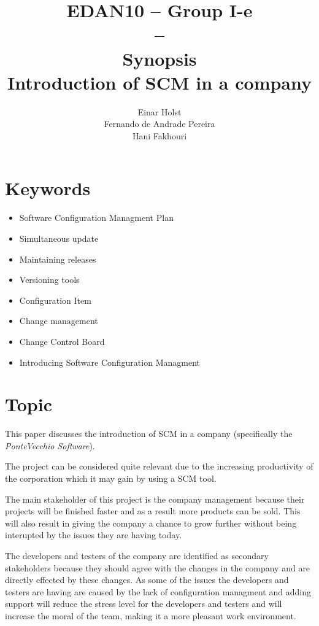 \documentclass[a4paper]{article}
\title{EDAN10 -- Group I-e\\--\\ Synopsis \\
Introduction of SCM in a company 
}
\author{Einar Holst \\
Fernando de Andrade Pereira \\
Hani Fakhouri
}
\begin{document}
\maketitle
\thispagestyle{empty}
\clearpage

\tableofcontents
\thispagestyle{empty}
\clearpage

\setcounter{page}{1}

\section{Keywords}
\begin{itemize}
\item Software Configuration Managment Plan
\item Simultaneous update
\item Maintaining releases
\item Versioning tools
\item Configuration Item
\item Change management
\item Change Control Board
\item Introducing Software Configuration Managment
\end{itemize}


\section{Topic}
This paper discusses the introduction of SCM in a company (specifically the \emph{PonteVecchio Software}).

The project can be considered quite relevant due to the increasing productivity of the corporation which it may gain by using a SCM tool.

The main stakeholder of this project is the company management because their projects will be finished faster and as a result more products can be sold. This will also result in giving the company a chance to grow further without being interupted by the issues they are having today.

The developers and testers of the company are identified as secondary stakeholders because they should agree with the changes in the company and are directly effected by these changes. As some of the issues the developers and testers are having are caused by the lack of configuration managment and adding support will reduce the stress level for the developers and testers and will increase the moral of the team, making it a more pleasant work environment.
\end{document}
